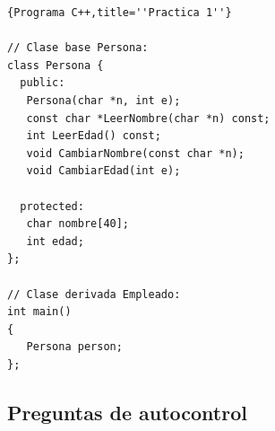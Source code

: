 \documentclass[a4paper,12pt,spanish]{article}
\newcommand\mylstcaption{}
\begin{document}
\renewcommand\mylstcaption{\textbf{Persona.cpp}}

\begin{lstlisting}[frame=trBL,breaklines=true, firstnumber=1,caption=\mylstcaption]{Programa C++,title=''Practica 1''}

// Clase base Persona:
class Persona {
  public:
   Persona(char *n, int e);
   const char *LeerNombre(char *n) const;
   int LeerEdad() const;
   void CambiarNombre(const char *n);
   void CambiarEdad(int e);
   
  protected:
   char nombre[40];
   int edad;
};
 
// Clase derivada Empleado:
int main()
{  
   Persona person;
};
\end{lstlisting}

\newpage

\subsection{Preguntas de autocontrol}
\label{sec:preg-de-autoc-4}
\end{document}

